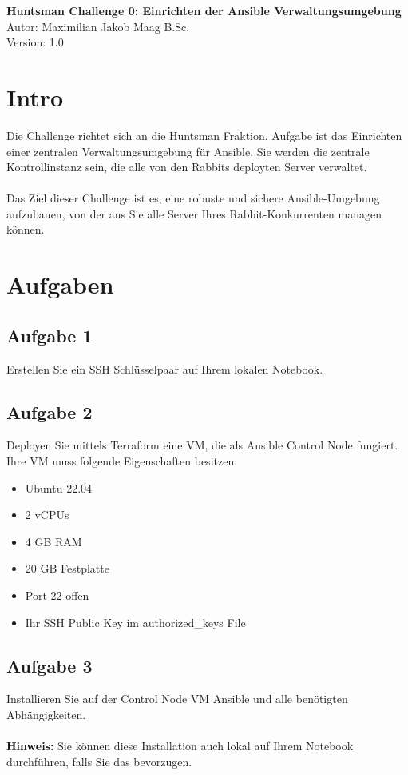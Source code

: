 \documentclass{article}
\begin{document}
    \begin{center}
        \Large \textbf{Huntsman Challenge 0: Einrichten der Ansible Verwaltungsumgebung} \\ [6pt]
        \normalsize
        Autor: Maximilian Jakob Maag B.Sc. \\
        Version: 1.0
    \end{center}

    \section{Intro}
    Die Challenge richtet sich an die Huntsman Fraktion. Aufgabe ist das Einrichten einer zentralen Verwaltungsumgebung für Ansible.
    Sie werden die zentrale Kontrollinstanz sein, die alle von den Rabbits deployten Server verwaltet.
    \\ \\
    Das Ziel dieser Challenge ist es, eine robuste und sichere Ansible-Umgebung aufzubauen, von der aus Sie alle Server Ihres Rabbit-Konkurrenten managen können.

    \section{Aufgaben}

    \subsection{Aufgabe 1}
    Erstellen Sie ein SSH Schlüsselpaar auf Ihrem lokalen Notebook.

    \subsection{Aufgabe 2}
    Deployen Sie mittels Terraform eine VM, die als Ansible Control Node fungiert.
    Ihre VM muss folgende Eigenschaften besitzen:
    \begin{itemize}
        \item Ubuntu 22.04
        \item 2 vCPUs
        \item 4 GB RAM
        \item 20 GB Festplatte
        \item Port 22 offen
        \item Ihr SSH Public Key im authorized\_keys File
    \end{itemize}

    \subsection{Aufgabe 3}
    Installieren Sie auf der Control Node VM Ansible und alle benötigten Abhängigkeiten.
    \\ \\
    \textbf{Hinweis:} Sie können diese Installation auch lokal auf Ihrem Notebook durchführen, falls Sie das bevorzugen.
\end{document}
